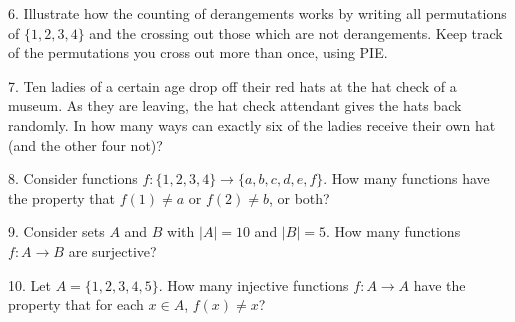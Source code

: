 \documentclass[10pt,]{book}
\theoremstyle{plain}
\theoremstyle{definition}
\theoremstyle{definition}
\theoremstyle{definition}
\numberwithin{equation}{section}
\begin{document}
\begin{exerciselist}
\par\smallskip
\item[6.]\hypertarget{exercise-97}{}
            Illustrate how the counting of derangements works by writing all permutations of \(\{1,2,3,4\}\) and the crossing out those which are not derangements. Keep track of the permutations you cross out more than once, using PIE.
\par\smallskip
\item[7.]\hypertarget{exercise-98}{}
            Ten ladies of a certain age drop off their red hats at the hat check of a museum. As they are leaving, the hat check attendant gives the hats back randomly. In how many ways can exactly six of the ladies receive their own hat (and the other four not)?
\par\smallskip
\item[8.]\hypertarget{exercise-99}{}
      Consider functions \(f: \{1,2,3,4\} \to \{a,b,c,d,e,f\}\).
      How many functions have the property that \(f(1) \ne a\) or \(f(2) \ne b\), or both?
\par\smallskip
\item[9.]\hypertarget{exercise-100}{}
      Consider sets \(A\) and \(B\) with \(|A| = 10\) and \(|B| = 5\). How many functions \(f: A \to B\) are surjective?
\par\smallskip
\item[10.]\hypertarget{exercise-101}{}
      Let \(A = \{1,2,3,4,5\}\). How many injective functions \(f:A \to A\) have the property that for each \(x \in A\), \(f(x) \ne x\)?
\par\smallskip
\end{exerciselist}
\typeout{************************************************}
\typeout{************************************************}
\end{document}
